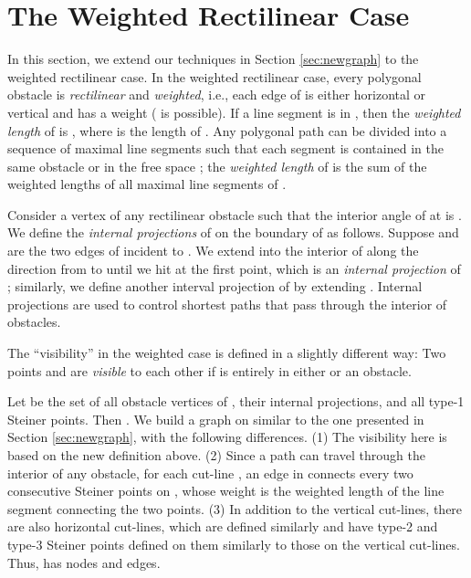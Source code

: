 \documentclass[english,runningheads,11pt]{llncs}
\begin{document}
\section{The Weighted Rectilinear Case}
\label{sec:weighted}

In this section, we extend our techniques in Section
\ref{sec:newgraph} to the weighted rectilinear case. In the
weighted rectilinear case, every polygonal obstacle  is
{\it rectilinear} and {\it weighted}, i.e., each edge of  is
either horizontal or vertical and  has a weight
 ( is possible). If a line segment  is in ,
then the {\em weighted length} of  is , where  is the  length of
. Any polygonal path  can be divided into a sequence of maximal
line segments such that each segment is contained in the same obstacle
or in the free space ; the {\em weighted length} of  is the
sum of the weighted lengths of all maximal line segments of .


Consider a vertex  of any rectilinear obstacle  such that the interior angle
of  at  is . We define the {\em
internal projections} of  on the boundary  of  as follows.
Suppose  and  are the two edges of
 incident to . We extend  into the interior of
 along the direction from  to  until we hit 
at the first point, which is an {\em internal projection} of ; similarly,
we define another interval projection of   by extending
. Internal projections are used to control shortest
paths that pass through the interior of obstacles.

The ``visibility'' in the weighted case is defined in a slightly
different way: Two points  and  are {\em visible} to each other
if  is entirely in either  or an obstacle.


Let  be the set of all obstacle vertices of , their internal
projections, and all type-1 Steiner points. Then .
We build a graph  on  similar to the one presented in
Section \ref{sec:newgraph}, with the following differences.
(1) The visibility here is based on the new definition above.
(2) Since a path can travel through
the interior of any obstacle, for each cut-line , an edge
in  connects every two consecutive Steiner points on
, whose weight is the weighted length of the line segment
connecting the two points.
(3) In addition to the vertical
cut-lines, there are also horizontal cut-lines, which are defined
similarly and have type-2 and type-3 Steiner points defined on them similarly
to those on the vertical cut-lines.
Thus,  has  nodes and edges.
\end{document}
